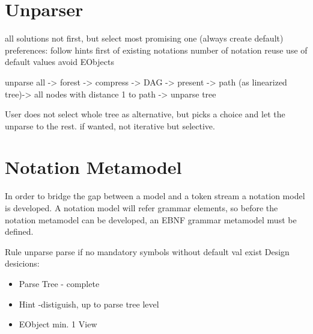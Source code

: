 \section{Unparser}
all solutions not first, but select most promising one (always create default)
preferences:
follow hints first of existing notations
number of notation reuse
use of default values
avoid EObjects

unparse all -> forest -> compress -> DAG -> present -> path (as linearized tree)-> all nodes with distance 1 to path -> unparse tree

User does not select whole tree as alternative, but picks a choice and let the unparse to the rest. if wanted, not iterative but selective.

\section{Notation Metamodel}
In order to bridge the gap between a model and a token stream a notation model is developed. A notation model will refer grammar elements, so before the notation metamodel can be developed, an EBNF grammar metamodel must be defined. 



Rule unparse parse if no mandatory symbols without default val exist
Design desicions:
\begin{itemize}
	\item Parse Tree - complete
	\item Hint -distiguish, up to parse tree level
	\item EObject min. 1 View
\end{itemize}

